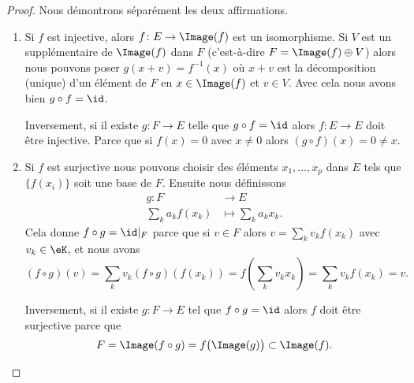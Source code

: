 \begin{proof}
	Nous démontrons séparément les deux affirmations.
	\begin{enumerate}
		\item
		      Si \( f\) est injective, alors \( f\colon E\to \Image(f)\) est un isomorphisme. Si $V$ est un supplémentaire de \( \Image(f)\) dans \( F\) (c'est-à-dire \( F=\Image(f)\oplus V\)) alors nous pouvons poser \( g(x+v)=f^{-1}(x)\) où \( x+v\) est la décomposition (unique) d'un élément de \( F\) en \( x\in\Image(f)\) et \( v\in V\). Avec cela nous avons bien \( g\circ f=\id\).

		      Inversement, si il existe \( g\colon F\to E\) telle que \( g\circ f=\id\) alors \( f\colon E\to E\) doit être injective. Parce que si \( f(x)=0\) avec \( x\neq 0\) alors \( (g\circ f)(x)=0\neq x\).
		\item
		      Si \( f\) est surjective nous pouvons choisir des éléments \( x_1,\ldots, x_p\) dans \( E\) tels que \( \{ f(x_i) \}\) soit une base de \( F\). Ensuite nous définissons
		      \begin{equation}
			      \begin{aligned}
				      g\colon F         & \to E                   \\
				      \sum_k a_k f(x_k) & \mapsto \sum_k a_k x_k.
			      \end{aligned}
		      \end{equation}
		      Cela donne \(  f\circ g=\id|_F\) parce que si \( v\in F\) alors \( v=\sum_kv_kf(x_k)\) avec \( v_k\in \eK\), et nous avons
		      \begin{equation}
			      (f\circ g)(v)=\sum_k v_k (f\circ g) \left(f(x_k)\right)
			      =f\left( \sum_k v_k x_k \right)
			      =\sum_k v_k f(x_k) = v.
		      \end{equation}

		      Inversement, si il existe \( g\colon F\to E\) tel que \( f\circ g=\id\) alors \( f\) doit être surjective parce que
		      \begin{equation}
			      F=\Image(f\circ g)=f\big( \Image(g) \big)\subset \Image(f).
		      \end{equation}
	\end{enumerate}
\end{proof}

